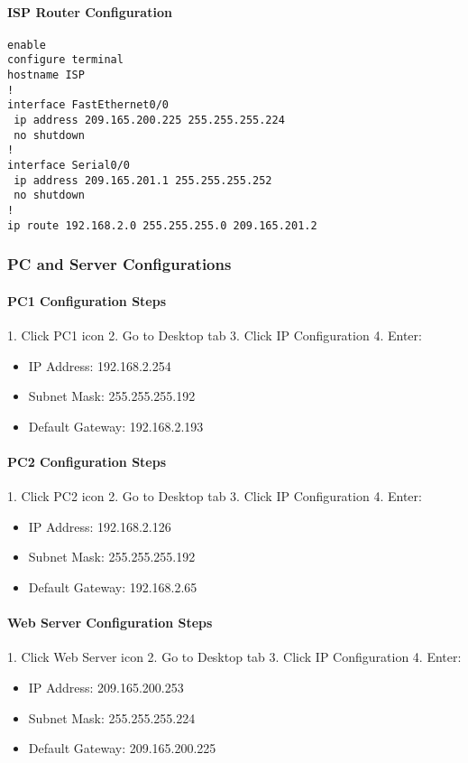 \documentclass[12pt]{article}
\begin{document}
\paragraph{ISP Router Configuration}
\begin{lstlisting}[frame=single]
enable
configure terminal
hostname ISP
!
interface FastEthernet0/0
 ip address 209.165.200.225 255.255.255.224
 no shutdown
!
interface Serial0/0
 ip address 209.165.201.1 255.255.255.252
 no shutdown
!
ip route 192.168.2.0 255.255.255.0 209.165.201.2
\end{lstlisting}

\subsubsection{PC and Server Configurations}
\paragraph{PC1 Configuration Steps}
1. Click PC1 icon
2. Go to Desktop tab
3. Click IP Configuration
4. Enter:
   \begin{itemize}
   \item IP Address: 192.168.2.254
   \item Subnet Mask: 255.255.255.192
   \item Default Gateway: 192.168.2.193
   \end{itemize}

\paragraph{PC2 Configuration Steps}
1. Click PC2 icon
2. Go to Desktop tab
3. Click IP Configuration
4. Enter:
   \begin{itemize}
   \item IP Address: 192.168.2.126
   \item Subnet Mask: 255.255.255.192
   \item Default Gateway: 192.168.2.65
   \end{itemize}

\paragraph{Web Server Configuration Steps}
1. Click Web Server icon
2. Go to Desktop tab
3. Click IP Configuration
4. Enter:
   \begin{itemize}
   \item IP Address: 209.165.200.253
   \item Subnet Mask: 255.255.255.224
   \item Default Gateway: 209.165.200.225
   \end{itemize}
\end{document}
